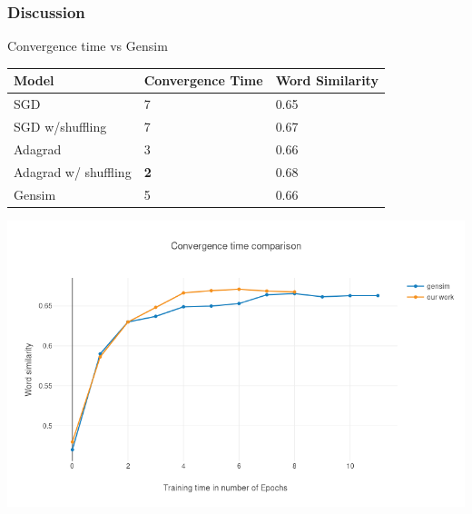 \begin{frame}
\frametitle{Discussion}
Convergence time vs Gensim 
    \begin{table}[]
\begin{tabular}{|l|l|l|}
\hline
Model    & Convergence Time & Word Similarity \\ \hline
SGD & {7}              & 0.65            \\ \hline
SGD w/shuffling & {7}              & 0.67            \\ \hline
Adagrad & {3}              & 0.66            \\ \hline
Adagrad w/ shuffling & \textbf{2}              & 0.68      \\ \hline
Gensim   & 5          & 0.66            \\ \hline
\end{tabular}
\end{table}
\includegraphics[scale=0.3]{images/gensim_vs_adam}
  \end{frame}